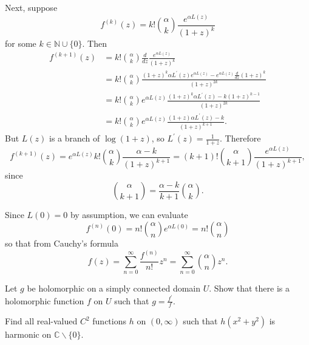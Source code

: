 \documentclass{article}
\newcounter{Problem}
\newenvironment{Problem}{\begin{Exercise}[name={Problem},
                                          counter={Problem}]}
                        {\end{Exercise}}
\begin{document}
\begin{Answer}
Next, suppose 
$$
f^{(k)}(z) = k! {\alpha \choose k} \frac{e^{\alpha L(z)}}{(1 + z)^k}
$$
for some $k \in \mathbb{N} \cup \{ 0 \}$. Then
\begin{align*}
   f^{(k+1)}(z)
&= k! {\alpha \choose k}
   \frac{d}{dz}
   \frac{e^{\alpha L(z)}}{(1 + z)^k} \\
&= k! {\alpha \choose k}
   \frac{ (1 + z)^k \alpha L^\prime(z) e^{\alpha L(z)}
        - e^{\alpha L(z)} \frac{d}{dz} (1 + z)^k     
   }
   {(1 + z)^{2k}} \\
&= k! {\alpha \choose k}
   e^{\alpha L(z)}
   \frac{(1 + z)^k \alpha L^{\prime}(z) - k (1 + z)^{k-1}}
        {(1 + z)^{2k}} \\
&= k! {\alpha \choose k}
   e^{\alpha L(z)}
   \frac{(1 + z) \alpha L^\prime(z) - k}{(1 + z)^{k + 1}}.
\end{align*}
But $L(z)$ is a branch of $\log (1 + z)$, so $L^\prime(z) = \frac{1}{1 + z}$.
Therefore
$$
  f^{(k+1)}(z) 
= e^{\alpha L(z)} k!
  {\alpha \choose k}
  \frac{\alpha - k}{(1 + z)^{k+1}}
= (k + 1)! {\alpha \choose k + 1} \frac{e^{\alpha L(z)}}{(1 + z)^{k+1}},
$$
since
$$
  {\alpha \choose k + 1} 
= \frac{\alpha - k}{k+1} {\alpha \choose k}.
$$

Since $L(0) = 0$ by assumption, we can evaluate
$$
  f^{(n)}(0) 
= n! {\alpha \choose n} e^{\alpha L(0)}
= n! {\alpha \choose n}
$$
so that from Cauchy's formula
$$
  f(z)
= \sum_{n=0}^\infty \frac{f^{(n)}}{n!} z^n
= \sum_{n=0}^\infty {\alpha \choose n} z^n.
$$

\end{Answer}

\begin{Problem}
Let $g$ be holomorphic on a simply connected domain $U$. Show that there is a
holomorphic function $f$ on $U$ such that $g = \frac{f^\prime}{f}$.
\end{Problem}

\begin{Problem}
Find all real-valued $C^2$ functions $h$ on $(0, \infty)$ such that
$h(x^2 + y^2)$ is harmonic on $\mathbb{C} \backslash \{ 0 \}$.
\end{Problem}
\end{document}
